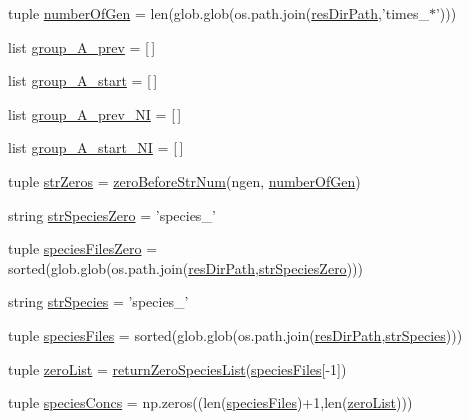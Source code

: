 \begin{DoxyCompactItemize}
\item 
tuple \hyperlink{a00098_a54acb4eba0735e72c2a820383febd37f}{number\-Of\-Gen} = len(glob.\-glob(os.\-path.\-join(\hyperlink{a00098_ab3da7da39258338965b6eef645a913ee}{res\-Dir\-Path},'times\-\_\-$\ast$')))
\item 
list \hyperlink{a00098_a1dd2f2c85f697e454c99be1a157d6c17}{group\-\_\-\-A\-\_\-prev} = \mbox{[}$\,$\mbox{]}
\item 
list \hyperlink{a00098_a3898175300d001a17a60c23656d2812f}{group\-\_\-\-A\-\_\-start} = \mbox{[}$\,$\mbox{]}
\item 
list \hyperlink{a00098_a4d77133a6a303d9486944707f3310cf8}{group\-\_\-\-A\-\_\-prev\-\_\-\-N\-I} = \mbox{[}$\,$\mbox{]}
\item 
list \hyperlink{a00098_aedb746884c5ae6e301c8ad2d8307fe4d}{group\-\_\-\-A\-\_\-start\-\_\-\-N\-I} = \mbox{[}$\,$\mbox{]}
\item 
tuple \hyperlink{a00098_a292c23aa303304f24632662a5dfbfa23}{str\-Zeros} = \hyperlink{a00098_aeeb6d629132a9755b45a3008d445419c}{zero\-Before\-Str\-Num}(ngen, \hyperlink{a00098_a54acb4eba0735e72c2a820383febd37f}{number\-Of\-Gen})
\item 
string \hyperlink{a00098_a52f7239b2be2cb978182547960b6c46e}{str\-Species\-Zero} = 'species\-\_\-'
\item 
tuple \hyperlink{a00098_a5584994da277e7798c904342dff18427}{species\-Files\-Zero} = sorted(glob.\-glob(os.\-path.\-join(\hyperlink{a00098_ab3da7da39258338965b6eef645a913ee}{res\-Dir\-Path},\hyperlink{a00098_a52f7239b2be2cb978182547960b6c46e}{str\-Species\-Zero})))
\item 
string \hyperlink{a00098_ab14d209fe558e83aeede3b657a7241bb}{str\-Species} = 'species\-\_\-'
\item 
tuple \hyperlink{a00098_af3291bd263282353dd4a12ee38c08cae}{species\-Files} = sorted(glob.\-glob(os.\-path.\-join(\hyperlink{a00098_ab3da7da39258338965b6eef645a913ee}{res\-Dir\-Path},\hyperlink{a00098_ab14d209fe558e83aeede3b657a7241bb}{str\-Species})))
\item 
tuple \hyperlink{a00098_ac2f9e6ead14745bd749a1ab8060cd4e7}{zero\-List} = \hyperlink{a00098_ad7c75c1e146fa51da42274cf7d5747d0}{return\-Zero\-Species\-List}(\hyperlink{a00098_af3291bd263282353dd4a12ee38c08cae}{species\-Files}\mbox{[}-\/1\mbox{]})
\item 
tuple \hyperlink{a00098_a2377568425051a7511b51f7c50662ba1}{species\-Concs} = np.\-zeros((len(\hyperlink{a00098_af3291bd263282353dd4a12ee38c08cae}{species\-Files})+1,len(\hyperlink{a00098_ac2f9e6ead14745bd749a1ab8060cd4e7}{zero\-List})))

\end{DoxyCompactItemize}
